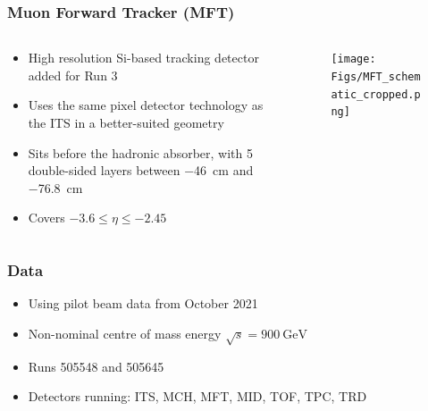 \documentclass[11pt]{beamer}
\begin{document}
\begin{frame}
    \frametitle{Muon Forward Tracker (MFT)}

    \begin{columns}[c]
        \begin{column}{0.5\textwidth}
            \begin{itemize}
                \item High resolution Si-based tracking detector added for Run 3
                \item Uses the same pixel detector technology as the ITS in a better-suited geometry
                \item Sits before the hadronic absorber, with 5 double-sided layers between \SI{-46}{\centi\metre} and \SI{-76.8}{\centi\metre}
                \item Covers $-3.6\leq\eta\leq -2.45$
            \end{itemize}
        \end{column}

        \begin{column}{0.5\textwidth}
            \begin{figure}[h]
                \begin{center}
                    \texttt{[image: Figs/MFT\_schematic\_cropped.png]}
                \end{center}
            \end{figure}
        \end{column}
    \end{columns}

\end{frame}

\begin{frame}
    \frametitle{Data}

    \begin{itemize}
        \item Using pilot beam data from October 2021
        \item Non-nominal centre of mass energy $\sqrt{s}=\SI{900}{\giga\electronvolt}$
        \item Runs 505548 and 505645
        \item Detectors running: ITS, MCH, MFT, MID, TOF, TPC, TRD
    \end{itemize}

\end{frame}
\end{document}
